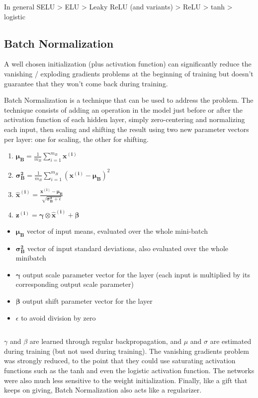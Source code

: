 \documentclass[french]{article}
\begin{document}
In general SELU > ELU > Leaky ReLU (and variants) > ReLU > tanh > logistic

\subsection{Batch Normalization}

A well chosen initialization (plus activation function) can significantly reduce the vanishing / exploding gradients problems at the beginning of training but doesn't guarantee that they won't come back during training.

Batch Normalization is a technique that can be used to address the problem. The technique consists of adding an operation in the model just before or after the activation function of each hidden layer, simply zero-centering and normalizing each input, then scaling and shifting the result using two new parameter vectors per layer: one for scaling, the other for shifting.

\begin{enumerate}
    \item $\bm{\mu_B} = \frac{1}{m_B} \sum_{i=1}^{m_B} \bm{x^{(i)}}$
    \item $\bm{\sigma_B^2} = \frac{1}{m_B} \sum_{i=1}^{m_B} (\bm{x^{(i)}} - \bm{\mu_B})^2$
    \item $\bm{\hat x^{(i)}} = \frac{\bm{x^{(i)}} - \bm{\mu_B}}{\sqrt{\bm{\sigma_B^2} + \epsilon}}$
    \item $\bm{z^{(i)}} = \bm{\gamma} \otimes \bm{\hat x^{(i)}} + \bm{\beta}$
\end{enumerate}

\begin{itemize}
    \item $\bm{\mu_B}$ vector of input means, evaluated over the whole mini-batch
    \item $\bm{\sigma_B^2}$ vector of input standard deviations, also evaluated over the whole minibatch
    \item $\bm{\gamma}$ output scale parameter vector for the layer (each input is multiplied by its corresponding output scale parameter)
    \item $\bm{\beta}$ output shift parameter vector for the layer
    \item $\epsilon$ to avoid division by zero
\end{itemize}

$ $

$\gamma$ and $\beta$ are learned through regular backpropagation, and $\mu$ and $\sigma$ are estimated during training (but not used during training). The vanishing gradients problem was strongly reduced, to the point that they could use saturating activation functions such as the tanh and even the logistic activation function.  The networks were also much less sensitive to the weight initialization. Finally, like a gift that keeps on giving, Batch Normalization also acts like a regularizer.
\end{document}
